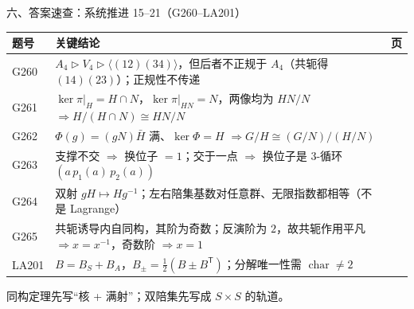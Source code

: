 \documentclass[aspectratio=169,10pt,fontset=none]{ctexbeamer}
\begin{document}
\begin{frame}[t]{六、答案速查：系统推进 15--21（G260--LA201）}
  \centering
  \scriptsize
  \setlength{\tabcolsep}{3pt}
  \renewcommand{\arraystretch}{1.14}
  \begin{tabular}{@{}l p{9.9cm} c@{}}
    \toprule
    题号 & 关键结论 & 页\\
    \midrule
    G260 & $A_4\triangleright V_4\triangleright\langle(12)(34)\rangle$，但后者不正规于 $A_4$（共轭得 $(14)(23)$）；正规性不传递 & \pageref{ex:G260}\\
    G261 & $\ker\pi|_H=H\cap N$，$\ker\pi|_{HN}=N$，两像均为 $HN/N$ $\Rightarrow H/(H\cap N)\cong HN/N$ & \pageref{ex:G261}\\
    G262 & $\Phi(g)=(gN)\bar H$ 满、$\ker\Phi=H$ $\Rightarrow G/H\cong(G/N)/(H/N)$ & \pageref{ex:G262}\\
    G263 & 支撑不交 $\Rightarrow$ 换位子 $=1$；交于一点 $\Rightarrow$ 换位子是 $3$-循环 $(a\,p_1(a)\,p_2(a))$ & \pageref{ex:G263}\\
    G264 & 双射 $gH\mapsto Hg^{-1}$；左右陪集基数对任意群、无限指数都相等（不是 Lagrange） & \pageref{ex:G264}\\
    G265 & 共轭诱导内自同构，其阶为奇数；反演阶为 $2$，故共轭作用平凡 $\Rightarrow x=x^{-1}$，奇数阶 $\Rightarrow x=1$ & \pageref{ex:G265}\\
    LA201 & $B=B_S+B_A$，$B_\pm=\tfrac12(B\pm B^{\mathsf T})$；分解唯一性需 $\operatorname{char}\ne2$ & \pageref{ex:LA201}\\
    \bottomrule
  \end{tabular}
  \par
  \vspace{0.3em}
  {\scriptsize\color{ink!70} 同构定理先写“核 + 满射”；双陪集先写成 $S\times S$ 的轨道。}
\end{frame}
\end{document}

